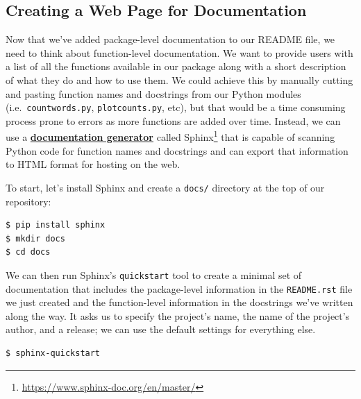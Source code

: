 \documentclass[
]{krantz}
\renewcommand{\href}[2]{#2\footnote{\url{#1}}}
\newcommand{\gref}[2]{\hyperlink{#2}{\textbf{#1}}}
\begin{document}
\hypertarget{packaging-sphinx}{%
\subsection{Creating a Web Page for Documentation}\label{packaging-sphinx}}

Now that we've added package-level documentation to our README file,
we need to think about function-level documentation.
We want to provide users with a list of all the functions available in our package
along with a short description of what they do and how to use them.
We could achieve this by manually cutting and pasting function names and docstrings
from our Python modules (i.e.~\texttt{countwords.py}, \texttt{plotcounts.py}, etc),
but that would be a time consuming process prone to errors as more functions are added over time.
Instead, we can use a \gref{documentation generator}{documentation\_generator}
called \href{https://www.sphinx-doc.org/en/master/}{Sphinx}
that is capable of scanning Python code for function names and docstrings
and can export that information to HTML format for hosting on the web.

To start, let's install Sphinx and create a \texttt{docs/} directory at the top of our repository:

\begin{verbatim}
$ pip install sphinx
$ mkdir docs
$ cd docs
\end{verbatim}

We can then run Sphinx's \texttt{quickstart} tool to create a minimal set of documentation
that includes the package-level information in the \texttt{README.rst} file we just created
and the function-level information in the docstrings we've written along the way.
It asks us to specify the project's name,
the name of the project's author,
and a release;
we can use the default settings for everything else.

\begin{verbatim}
$ sphinx-quickstart
\end{verbatim}
\end{document}

